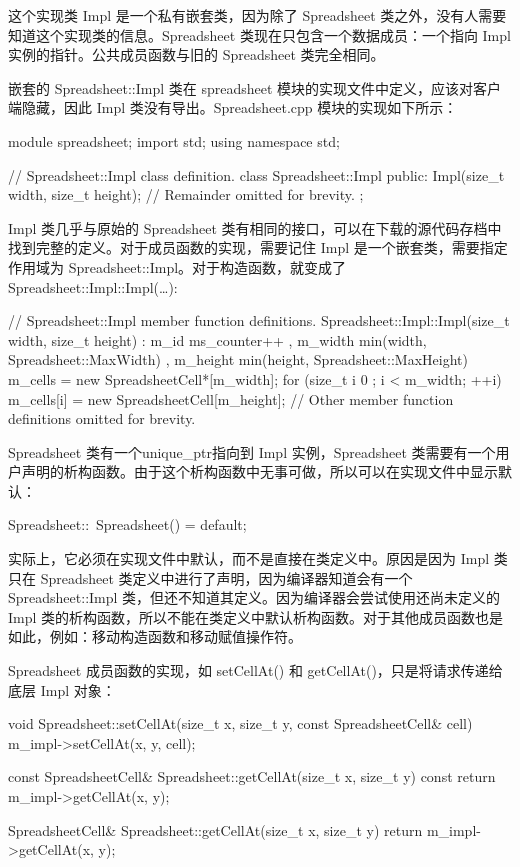 这个实现类 Impl 是一个私有嵌套类，因为除了 Spreadsheet 类之外，没有人需要知道这个实现类的信息。Spreadsheet 类现在只包含一个数据成员：一个指向 Impl 实例的指针。公共成员函数与旧的 Spreadsheet 类完全相同。

嵌套的 Spreadsheet::Impl 类在 spreadsheet 模块的实现文件中定义，应该对客户端隐藏，因此 Impl 类没有导出。Spreadsheet.cpp 模块的实现如下所示：

\begin{cpp}
module spreadsheet;
import std;
using namespace std;

// Spreadsheet::Impl class definition.
class Spreadsheet::Impl
{
    public:
        Impl(size_t width, size_t height);
        // Remainder omitted for brevity.
};
\end{cpp}

Impl 类几乎与原始的 Spreadsheet 类有相同的接口，可以在下载的源代码存档中找到完整的定义。对于成员函数的实现，需要记住 Impl 是一个嵌套类，需要指定作用域为 Spreadsheet::Impl。对于构造函数，就变成了 Spreadsheet::Impl::Impl(…):

\begin{cpp}
// Spreadsheet::Impl member function definitions.
Spreadsheet::Impl::Impl(size_t width, size_t height)
    : m_id { ms_counter++ }
    , m_width { min(width, Spreadsheet::MaxWidth) }
    , m_height { min(height, Spreadsheet::MaxHeight) }
{
    m_cells = new SpreadsheetCell*[m_width];
    for (size_t i { 0 }; i < m_width; ++i) {
        m_cells[i] = new SpreadsheetCell[m_height];
    }
}
// Other member function definitions omitted for brevity.
\end{cpp}

Spreadsheet 类有一个unique\_ptr指向到 Impl 实例，Spreadsheet 类需要有一个用户声明的析构函数。由于这个析构函数中无事可做，所以可以在实现文件中显示默认：

\begin{cpp}
Spreadsheet::~Spreadsheet() = default;
\end{cpp}

实际上，它必须在实现文件中默认，而不是直接在类定义中。原因是因为 Impl 类只在 Spreadsheet 类定义中进行了声明，因为编译器知道会有一个 Spreadsheet::Impl 类，但还不知道其定义。因为编译器会尝试使用还尚未定义的 Impl 类的析构函数，所以不能在类定义中默认析构函数。对于其他成员函数也是如此，例如：移动构造函数和移动赋值操作符。

Spreadsheet 成员函数的实现，如 setCellAt() 和 getCellAt()，只是将请求传递给底层 Impl 对象：

\begin{cpp}
void Spreadsheet::setCellAt(size_t x, size_t y, const SpreadsheetCell& cell)
{
    m_impl->setCellAt(x, y, cell);
}

const SpreadsheetCell& Spreadsheet::getCellAt(size_t x, size_t y) const
{
    return m_impl->getCellAt(x, y);
}

SpreadsheetCell& Spreadsheet::getCellAt(size_t x, size_t y)
{
    return m_impl->getCellAt(x, y);
}
\end{cpp}

